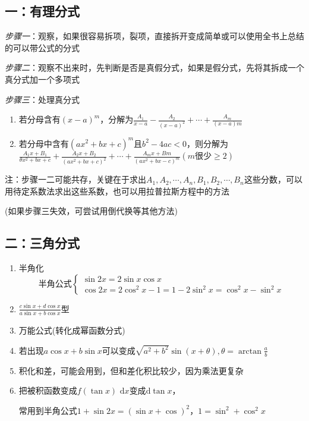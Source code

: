 \documentclass[a4paper,11pt]{book}
\begin{document}
\subsection*{一：有理分式}



\emph{步骤一}：观察，如果很容易拆项，裂项，直接拆开变成简单或可以使用全书上总结的可以带公式的分式

\vspace{2ex}

\noindent  \emph{步骤二}：观察不出来时，先判断是否是真假分式，如果是假分式，先将其拆成一个真分式加一个多项式

\vspace{2ex}

\noindent  \emph{步骤三}：处理真分式
    \begin{enumerate}
        \item 若分母含有$(x-a)^{m}$，分解为$\displaystyle{\frac{A_{1}}{x-a}-\frac{A_{2}}{(x-a)^{2}}+\cdots +\frac{A_{m}}{(x-a)m}}$
        \item 若分母中含有$(ax^{2}+bx+c)^{m}$且$b^{2}-4ac<0$，则分解为$\displaystyle{\frac{A_{1} x+B_{1}}{\theta x^{2}+b x+c}+\frac{A_{2} x+B_{2}}{\left(a x^{2}+b x+c\right)^{2}}}+\cdots+\frac{A _{m} x+B m}{\left(a x^{2}+b x-c\right)^{m}}(m \text{很少}\ge 2)$
    \end{enumerate}

\vspace{2ex}

注：步骤一二可能共存，关键在于求出$A_{1},A_{2},\cdots,A_{n},B_{1},B_{2},\cdots,B_{n}$这些分数，可以用待定系数法求出这些系数，也可以用拉普拉斯方程中的方法

(如果步骤三失效，可尝试用倒代换等其他方法)

\subsection*{二：三角分式}

\begin{enumerate}
    \item 半角化
          \[
          \text{半角公式}
          \begin{cases}
              \sin 2x = 2 \sin x \cos x\\
              \cos 2x = 2 \cos ^{2} x -1 =1-2\sin ^{2} x=\cos ^{2}x-\sin ^{2}x
          \end{cases}    
          \]
    \item $\displaystyle{\frac{c\sin x+d \cos x}{a \sin x +b\cos x}}$型
    \item 万能公式(转化成幂函数分式)
    \item 若出现$a \cos x +b \sin x$可以变成$\sqrt{a^{2}+b^{2}}\sin (x + \theta),\theta = \arctan \frac{a}{b}$
    \item 积化和差，可能会用到，但和差化积比较少，因为乘法更复杂
    \item 把被积函数变成$f(\tan x)$ \quad $\mathrm{d}x$变成$\mathrm{d}\tan x$，
    
    常用到半角公式$1+\sin 2x =(\sin x +\cos)^{2}，1=\sin^{2}+\cos ^{2}x$
\end{enumerate}
\end{document}
